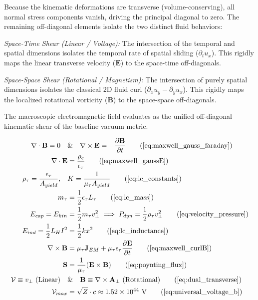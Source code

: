 \documentclass[11pt, a4paper]{article}
\begin{document}
Because the kinematic deformations are transverse (volume-conserving), all normal stress components vanish, driving the principal diagonal to zero. The remaining off-diagonal elements isolate the two distinct fluid behaviors:

\textit{Space-Time Shear (Linear / Voltage):} The intersection of the temporal and spatial dimensions isolates the temporal rate of spatial sliding ($\partial_t u_x$). This rigidly maps the linear transverse velocity ($\mathbf{E}$) to the space-time off-diagonals. 

\textit{Space-Space Shear (Rotational / Magnetism):} The intersection of purely spatial dimensions isolates the classical 2D fluid curl ($\partial_x u_y - \partial_y u_x$). This rigidly maps the localized rotational vorticity ($\mathbf{B}$) to the space-space off-diagonals. 

The macroscopic electromagnetic field evaluates as the unified off-diagonal kinematic shear of the baseline vacuum metric.

\begin{tcolorbox}[recallbox, title={\ref{box:em_lc_isomorphism}. EM Kinematics \& The LC-Acoustic Isomorphism}]
\begin{align}
    \nabla \cdot \mathbf{B} = 0 \quad &\text{\&} \quad \nabla \times \mathbf{E} = -\frac{\partial \mathbf{B}}{\partial t} \tag{\ref{eq:maxwell_gauss_faraday}} \\
    \nabla \cdot \mathbf{E} &= \frac{\rho_e}{\epsilon_{\tau}} \tag{\ref{eq:maxwell_gaussE}} \\
    \rho_{\tau} = \frac{\epsilon_{\tau}}{A_{yield}}, \quad &K = \frac{1}{\mu_{\tau} A_{yield}} \tag{\ref{eq:lc_constants}} \\
    m_\tau &= \frac{1}{2} \epsilon_{\tau} L_\tau \tag{\ref{eq:lc_mass}} \\
    E_{cap} = E_{kin} &= \frac{1}{2} m_{\tau} v_{\perp}^2 \implies P_{dyn} = \frac{1}{2}\rho_{\tau} v_{\perp}^2 \tag{\ref{eq:velocity_pressure}} \\
    E_{ind} = \frac{1}{2} L_H I^2 &= \frac{1}{2} k x^2 \tag{\ref{eq:lc_inductance}} \\
    \nabla \times \mathbf{B} &= \mu_{\tau} \mathbf{J}_{EM} + \mu_{\tau} \epsilon_{\tau} \frac{\partial \mathbf{E}}{\partial t} \tag{\ref{eq:maxwell_curlB}} \\
    \mathbf{S} &= \frac{1}{\mu_{\tau}} (\mathbf{E} \times \mathbf{B}) \tag{\ref{eq:poynting_flux}} \\
    \mathcal{V} \equiv v_{\perp} \text{ (Linear)} \quad &\text{\&} \quad \mathbf{B} \equiv \nabla \times \mathbf{A}_{\perp} \text{ (Rotational)} \tag{\ref{eq:dual_transverse}} \\
    \mathcal{V}_{max} &= \sqrt{Z} \cdot c \approx 1.52 \times 10^{44} \text{ V} \tag{\ref{eq:universal_voltage_b}}
\end{align}
\end{tcolorbox}
\end{document}

